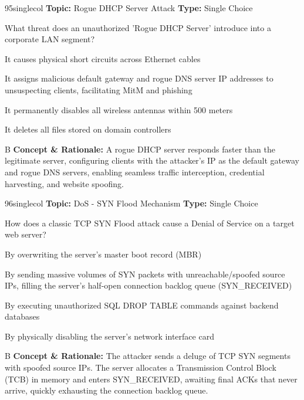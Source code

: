 \begin{qcard}{95}{singlecol}
\textcolor{darkslate!75}{\small\textbf{Topic:} Rogue DHCP Server Attack \hfill \textbf{Type:} Single Choice}\vspace{0.4em}\par
What threat does an unauthorized 'Rogue DHCP Server' introduce into a corporate LAN segment?
\begin{qoptions}
\item It causes physical short circuits across Ethernet cables
\item It assigns malicious default gateway and rogue DNS server IP addresses to unsuspecting clients, facilitating MitM and phishing
\item It permanently disables all wireless antennas within 500 meters
\item It deletes all files stored on domain controllers
\end{qoptions}
\end{qcard}
\nopagebreak
\begin{explainbox}{B}
\textbf{Concept \& Rationale:} A rogue DHCP server responds faster than the legitimate server, configuring clients with the attacker's IP as the default gateway and rogue DNS servers, enabling seamless traffic interception, credential harvesting, and website spoofing.
\end{explainbox}

\begin{qcard}{96}{singlecol}
\textcolor{darkslate!75}{\small\textbf{Topic:} DoS - SYN Flood Mechanism \hfill \textbf{Type:} Single Choice}\vspace{0.4em}\par
How does a classic TCP SYN Flood attack cause a Denial of Service on a target web server?
\begin{qoptions}
\item By overwriting the server's master boot record (MBR)
\item By sending massive volumes of SYN packets with unreachable/spoofed source IPs, filling the server's half-open connection backlog queue (SYN\_RECEIVED)
\item By executing unauthorized SQL DROP TABLE commands against backend databases
\item By physically disabling the server's network interface card
\end{qoptions}
\end{qcard}
\nopagebreak
\begin{explainbox}{B}
\textbf{Concept \& Rationale:} The attacker sends a deluge of TCP SYN segments with spoofed source IPs. The server allocates a Transmission Control Block (TCB) in memory and enters SYN\_RECEIVED, awaiting final ACKs that never arrive, quickly exhausting the connection backlog queue.
\end{explainbox}

